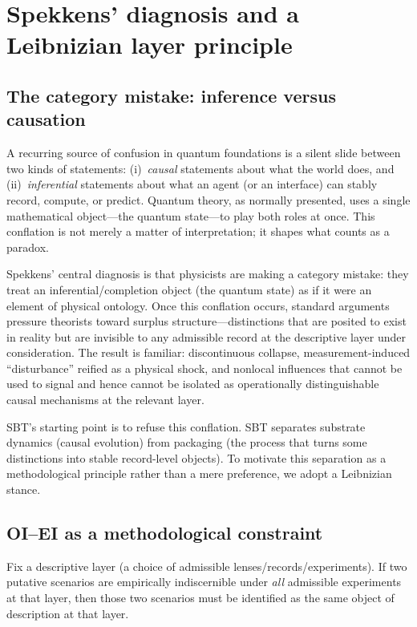 \section{Spekkens' diagnosis and a Leibnizian layer principle}\label{sec:spekkens}

\subsection{The category mistake: inference versus causation}

A recurring source of confusion in quantum foundations is a silent slide between two kinds of statements:
(i)~\emph{causal} statements about what the world does, and
(ii)~\emph{inferential} statements about what an agent (or an interface) can stably record, compute, or predict.
Quantum theory, as normally presented, uses a single mathematical object---the quantum state---to play both roles at once. This conflation is not merely a matter of interpretation; it shapes what counts as a paradox.

Spekkens' central diagnosis is that physicists are making a category mistake: they treat an inferential/completion object (the quantum state) as if it were an element of physical ontology.\cite{Spekkens2007Toy} Once this conflation occurs, standard arguments pressure theorists toward surplus structure---distinctions that are posited to exist in reality but are invisible to any admissible record at the descriptive layer under consideration. The result is familiar: discontinuous collapse, measurement-induced ``disturbance'' reified as a physical shock, and nonlocal influences that cannot be used to signal and hence cannot be isolated as operationally distinguishable causal mechanisms at the relevant layer.

SBT's starting point is to refuse this conflation. SBT separates substrate dynamics (causal evolution) from packaging (the process that turns some distinctions into stable record-level objects). To motivate this separation as a methodological principle rather than a mere preference, we adopt a Leibnizian stance.

\subsection{OI--EI as a methodological constraint}

\begin{principle}
Fix a descriptive layer (a choice of admissible lenses/records/experiments). If two putative scenarios are empirically indiscernible under \emph{all} admissible experiments at that layer, then those two scenarios must be identified as the same object of description at that layer.
\end{principle}

